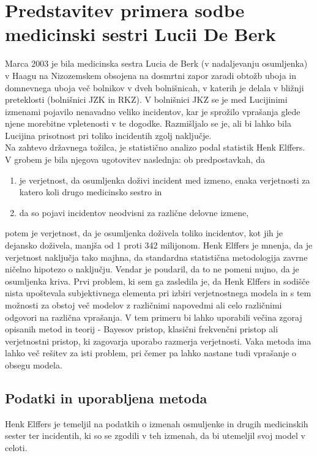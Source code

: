 \documentclass[12pt,a4paper]{amsart}
\theoremstyle{definition} %
\theoremstyle{plain} %
\begin{document}
\section{ Predstavitev primera sodbe medicinski sestri Lucii De Berk}
Marca 2003 je bila medicinska sestra Lucia de Berk (v nadaljevanju osumljenka) v Haagu na Nizozemskem obsojena na dosmrtni zapor zaradi obtožb 
uboja in domnevnega uboja več bolnikov v dveh bolnišnicah, v katerih je delala v bližnji preteklosti (bolnišnici JZK in RKZ). V bolnišnici JKZ 
se je med Lucijinimi izmenami pojavilo nenavadno veliko incidentov, kar je sprožilo vprašanja glede njene morebitne vpletenosti v te dogodke. 
Razmišljalo se je, ali bi lahko bila Lucijina prisotnost pri toliko incidentih zgolj naključje.\\
Na zahtevo državnega tožilca, je statistično analizo podal statistik Henk Elffers. V grobem je bila njegova ugotovitev naslednja: ob predpostavkah, da
\begin{enumerate}
    \item je verjetnost, da osumljenka doživi incident med izmeno, enaka verjetnosti za katero koli drugo medicinsko sestro in
    \item da so pojavi incidentov neodvisni za različne delovne izmene,
\end{enumerate}
potem je verjetnost, da je osumljenka doživela toliko incidentov, kot jih je dejansko doživela, manjša od 1 proti 342 milijonom. Henk Elffers je mnenja, 
da je verjetnost naključja tako majhna, da standardna statistična metodologija zavrne ničelno hipotezo o naključju. Vendar je poudaril, da 
to ne pomeni nujno, da je osumljenka kriva. Prvi problem, ki sem ga zasledila je, da Henk Elffers in sodišče nista upoštevala subjektivnega 
elementa pri izbiri verjetnostnega modela in s tem možnosti za obstoj več modelov z različnimi napovedmi ali celo različnimi odgovori 
na različna vprašanja. V tem primeru bi lahko uporabili večina zgoraj opisanih metod in teorij - Bayesov pristop, klasični frekvenčni pristop ali 
verjetnostni pristop, ki zagovarja uporabo razmerja verjetnosti.  Vaka metoda ima lahko več rešitev za isti problem, pri čemer pa lahko nastane 
tudi vprašanje o obsegu modela.

\subsection{Podatki in uporabljena metoda}
Henk Elffers je temeljil na podatkih o izmenah osmuljenke in drugih medicinskih sester ter incidentih, ki so se zgodili v teh izmenah, da bi 
utemeljil svoj model v celoti.
\end{document}
